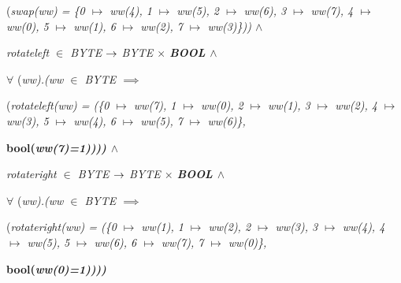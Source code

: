 \begin{sloppypar}
\hspace*{0.30in}\rm (\it swap\rm (\it ww\rm ) \rm = \rm \{\rm 0 $\mapsto$ \it ww\rm (\rm 4\rm )\rm , \rm 1 $\mapsto$ \it ww\rm (\rm 5\rm )\rm , \rm 2 $\mapsto$ \it ww\rm (\rm 6\rm )\rm , \rm 3 $\mapsto$ \it ww\rm (\rm 7\rm )\rm , \rm 4 $\mapsto$ \it ww\rm (\rm 0\rm )\rm , \rm 5 $\mapsto$ \it ww\rm (\rm 1\rm )\rm , \rm 6 $\mapsto$ \it ww\rm (\rm 2\rm )\rm , \rm 7 $\mapsto$ \it ww\rm (\rm 3\rm )\rm \}\rm )\rm )  $\land$  

\hspace*{0.20in}\it rotateleft  $\in$  \it BYTE  $\rightarrow$  \it BYTE  $\times$  \bf BOOL  $\land$  

\hspace*{0.20in} $\forall$  \rm (\it ww\rm )\rm .\rm (\it ww  $\in$  \it BYTE  $\implies$ 

\hspace*{0.30in}\rm (\it rotateleft\rm (\it ww\rm ) \rm = \rm (\rm \{\rm 0 $\mapsto$ \it ww\rm (\rm 7\rm )\rm , \rm 1 $\mapsto$ \it ww\rm (\rm 0\rm )\rm , \rm 2 $\mapsto$ \it ww\rm (\rm 1\rm )\rm , \rm 3 $\mapsto$ \it ww\rm (\rm 2\rm )\rm , \rm 4 $\mapsto$ \it ww\rm (\rm 3\rm )\rm , \rm 5 $\mapsto$ \it ww\rm (\rm 4\rm )\rm , \rm 6 $\mapsto$ \it ww\rm (\rm 5\rm )\rm , \rm 7 $\mapsto$ \it ww\rm (\rm 6\rm )\rm \}\rm , 

\hspace*{0.80in}\bf bool\rm (\it ww\rm (\rm 7\rm )\rm =\rm 1\rm )\rm )\rm )\rm )  $\land$  

\hspace*{0.20in}\it rotateright  $\in$  \it BYTE  $\rightarrow$  \it BYTE  $\times$  \bf BOOL\hspace*{0.10in} $\land$  

\hspace*{0.20in} $\forall$  \rm (\it ww\rm )\rm .\rm (\it ww  $\in$  \it BYTE\hspace*{0.10in} $\implies$ 

\hspace*{0.30in}\rm (\it rotateright\rm (\it ww\rm ) \rm = \rm (\rm \{\rm 0 $\mapsto$ \it ww\rm (\rm 1\rm )\rm , \rm 1 $\mapsto$ \it ww\rm (\rm 2\rm )\rm , \rm 2 $\mapsto$ \it ww\rm (\rm 3\rm )\rm , \rm 3 $\mapsto$ \it ww\rm (\rm 4\rm )\rm , \rm 4 $\mapsto$ \it ww\rm (\rm 5\rm )\rm , \rm 5 $\mapsto$ \it ww\rm (\rm 6\rm )\rm , \rm 6 $\mapsto$ \it ww\rm (\rm 7\rm )\rm , \rm 7 $\mapsto$ \it ww\rm (\rm 0\rm )\rm \}\rm , 

\hspace*{0.80in}\bf bool\rm (\it ww\rm (\rm 0\rm )\rm =\rm 1\rm )\rm )\rm )\rm )


\end{sloppypar}
